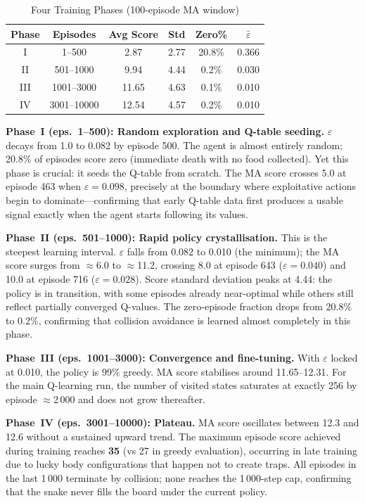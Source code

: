 \documentclass[10pt,conference]{IEEEtran}
\begin{document}
\begin{table}[h]
  \centering
  \caption{Four Training Phases (100-episode MA window)}
  \label{tab:phases}
  \begin{tabular}{cccccc}
    \toprule
    Phase & Episodes & Avg Score & Std & Zero\% & $\bar{\varepsilon}$ \\
    \midrule
    I   & 1--500    & 2.87  & 2.77 & 20.8\% & 0.366 \\
    II  & 501--1000 & 9.94  & 4.44 &  0.2\% & 0.030 \\
    III & 1001--3000 & 11.65 & 4.63 & 0.1\% & 0.010 \\
    IV  & 3001--10000 & 12.54 & 4.57 & 0.2\% & 0.010 \\
    \bottomrule
  \end{tabular}
\end{table}

\textbf{Phase~I (eps.\ 1--500): Random exploration and Q-table seeding.}
$\varepsilon$ decays from 1.0 to 0.082 by episode 500.
The agent is almost entirely random; 20.8\% of episodes score zero
(immediate death with no food collected).
Yet this phase is crucial: it seeds the Q-table from scratch.
The MA score crosses 5.0 at episode 463 when $\varepsilon=0.098$,
precisely at the boundary where exploitative actions begin to
dominate---confirming that early Q-table data first produces
a usable signal exactly when the agent starts following its values.

\textbf{Phase~II (eps.\ 501--1000): Rapid policy crystallisation.}
This is the steepest learning interval.
$\varepsilon$ falls from 0.082 to 0.010 (the minimum);
the MA score surges from $\approx$6.0 to $\approx$11.2,
crossing 8.0 at episode 643 ($\varepsilon=0.040$) and
10.0 at episode 716 ($\varepsilon=0.028$).
Score standard deviation peaks at 4.44: the policy is in
transition, with some episodes already near-optimal while others
still reflect partially converged Q-values.
The zero-episode fraction drops from 20.8\% to 0.2\%, confirming
that collision avoidance is learned almost completely in this phase.

\textbf{Phase~III (eps.\ 1001--3000): Convergence and fine-tuning.}
With $\varepsilon$ locked at 0.010, the policy is 99\% greedy.
MA score stabilises around 11.65--12.31.
For the main Q-learning run, the number of visited states saturates at
exactly 256 by episode $\approx$2\,000 and does not grow thereafter.

\textbf{Phase~IV (eps.\ 3001--10000): Plateau.}
MA score oscillates between 12.3 and 12.6 without a sustained
upward trend.
The maximum episode score achieved during training reaches
\textbf{35} (vs 27 in greedy evaluation), occurring in late training
due to lucky body configurations that happen not to create traps.
All episodes in the last 1\,000 terminate by collision; none
reaches the 1\,000-step cap, confirming that the snake never
fills the board under the current policy.
\end{document}

